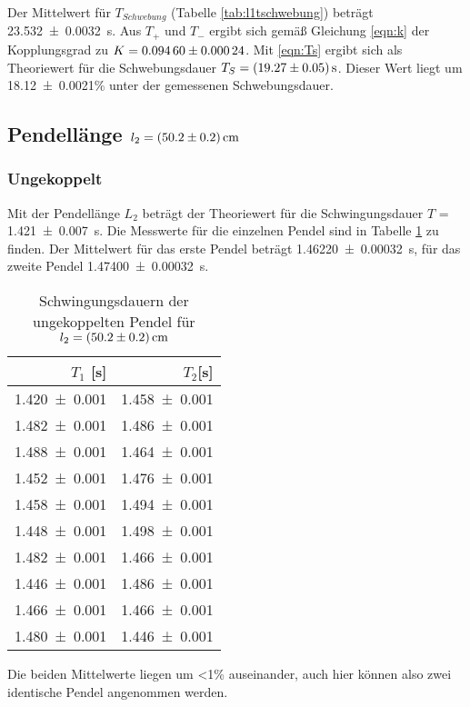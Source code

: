 Der Mittelwert für $T_{Schwebung}$ (Tabelle \ref{tab:l1tschwebung})
beträgt \SI{23.532+-0.0032}{\second}.
Aus $T_+$ und $T_-$ ergibt sich gemäß Gleichung \ref{eqn:k} der Kopplungsgrad zu
$K = \num{0.0946 +- 0.00024}$. Mit \ref{eqn:Ts} ergibt sich als Theoriewert
für die Schwebungsdauer $T_S = \SI{19.27+-0.05}{\second}$. Dieser Wert liegt
um \num{18.12+-0.0021}\% unter der gemessenen Schwebungsdauer.


\subsection{Pendellänge $l_2 = \SI{50.2 +- 0.2}{\centi\meter}$}

\subsubsection{Ungekoppelt}
Mit der Pendellänge $L_2$ beträgt der Theoriewert für die Schwingungsdauer
$T$ = \SI{1.421 +- 0.007}{\second}. Die Messwerte für die einzelnen Pendel
sind in Tabelle \ref{tab:l2ungekoppelt} zu finden.
Der Mittelwert für das erste Pendel beträgt \SI{1.46220+-0.00032}{\second}, für
das zweite Pendel \SI{1.47400+-0.00032}{\second}.
\begin{table}[H]
 \centering
 \caption{Schwingungsdauern der ungekoppelten
 Pendel für $l_2 = \SI{50.2 +- 0.2}{\centi\meter}$}
 \label{tab:l2ungekoppelt}
 \begin{tabular}{rr}
 \toprule
  {$T_1$ [\si{\second}]} & {$T_2$[\si{\second}]} \\
 \midrule
    \num{1.420 +- 0.001} & \num{1.458 +- 0.001} \\
    \num{1.482 +- 0.001} & \num{1.486 +- 0.001}\\
    \num{1.488 +- 0.001} & \num{1.464 +- 0.001}\\
    \num{1.452 +- 0.001} & \num{1.476 +- 0.001}\\
    \num{1.458 +- 0.001} & \num{1.494 +- 0.001}\\
    \num{1.448 +- 0.001} & \num{1.498 +- 0.001}\\
    \num{1.482 +- 0.001} & \num{1.466 +- 0.001}\\
    \num{1.446 +- 0.001} & \num{1.486 +- 0.001}\\
    \num{1.466 +- 0.001} & \num{1.466 +- 0.001}\\
    \num{1.480 +- 0.001} & \num{1.446 +- 0.001}\\
 \bottomrule
 \end{tabular}
\end{table}
Die beiden Mittelwerte liegen um <1\% auseinander, auch hier können also zwei
identische Pendel angenommen werden.

